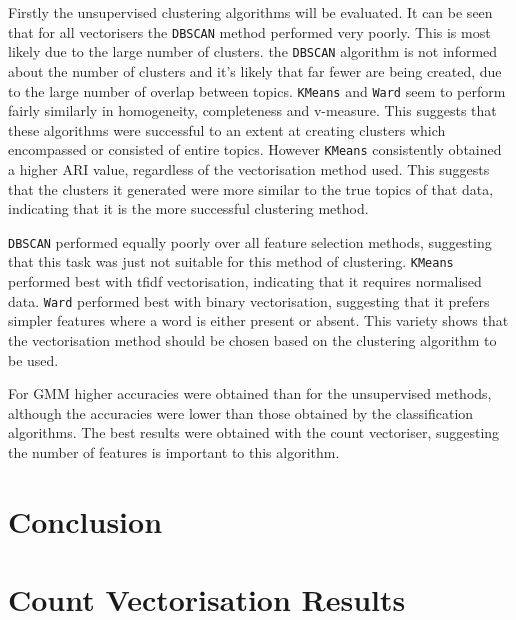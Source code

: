 \documentclass{article}
\begin{document}
Firstly the unsupervised clustering algorithms will be evaluated. It can be seen that for all vectorisers the \verb|DBSCAN| method performed very poorly. This is most likely due to the large number of clusters. the \verb|DBSCAN| algorithm is not informed about the number of clusters and it's likely that far fewer are being created, due to the large number of overlap between topics. \verb|KMeans| and \verb|Ward| seem to perform fairly similarly in homogeneity, completeness and v-measure. This suggests that these algorithms were successful to an extent at creating clusters which encompassed or consisted of entire topics. However \verb|KMeans| consistently obtained a higher ARI value, regardless of the vectorisation method used. This suggests that the clusters it generated were more similar to the true topics of that data, indicating that it is the more successful clustering method.

\verb|DBSCAN| performed equally poorly over all feature selection methods, suggesting that this task was just not suitable for this method of clustering. \verb|KMeans| performed best with tfidf vectorisation, indicating that it requires normalised data. \verb|Ward| performed best with binary vectorisation, suggesting that it prefers simpler features where a word is either present or absent. This variety shows that the vectorisation method should be chosen based on the clustering algorithm to be used.

For GMM higher accuracies were obtained than for the unsupervised methods, although the accuracies were lower than those obtained by the classification algorithms. The best results were obtained with the count vectoriser, suggesting the number of features is important to this algorithm.

\section{Conclusion}

\appendix

\section{Count Vectorisation Results}
\end{document}
